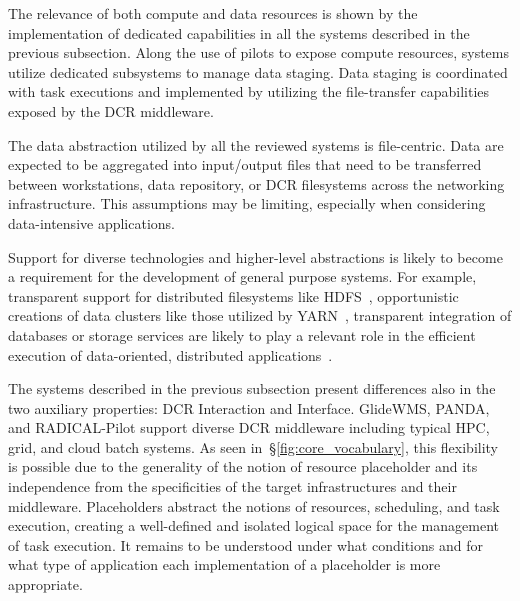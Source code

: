 \documentclass{sig-alternate}
\begin{document}


The relevance of both compute and data resources is shown by the implementation
of dedicated capabilities in all the \pilot systems described in the previous
subsection. Along the use of pilots to expose compute resources, \pilot systems
utilize dedicated subsystems to manage data staging. Data staging is coordinated
with task executions and implemented by utilizing the file-transfer capabilities
exposed by the DCR middleware.

The data abstraction utilized by all the reviewed \pilot systems is
file-centric. Data are expected to be aggregated into input/output files that
need to be transferred between workstations, data repository, or DCR filesystems
across the networking infrastructure. This assumptions may be limiting,
especially when considering data-intensive applications.

Support for diverse technologies and higher-level abstractions is likely to
become a requirement for the development of general purpose \pilot systems. For
example, transparent support for distributed filesystems like
HDFS~\cite{borthakur2008}, opportunistic creations of data clusters like those
utilized by YARN~\cite{vavilapalli2013}, transparent integration of databases or
storage services are likely to play a relevant role in the efficient execution
of data-oriented, distributed
applications~\cite{rey2015open,sboner2015primer,zhang2010}.



The \pilot systems described in the previous subsection present differences also
in the two auxiliary properties: DCR Interaction and Interface. GlideWMS, PANDA,
and RADICAL-Pilot support diverse DCR middleware including typical HPC, grid,
and cloud batch systems. As seen in~\S\ref{fig:core_vocabulary}, this
flexibility is possible due to the generality of the notion of resource
placeholder and its independence from the specificities of the target
infrastructures and their middleware. Placeholders abstract the notions of
resources, scheduling, and task execution, creating a well-defined and isolated
logical space for the management of task execution. It remains to be understood
under what conditions and for what type of application each implementation of a
placeholder is more appropriate.
\end{document}
